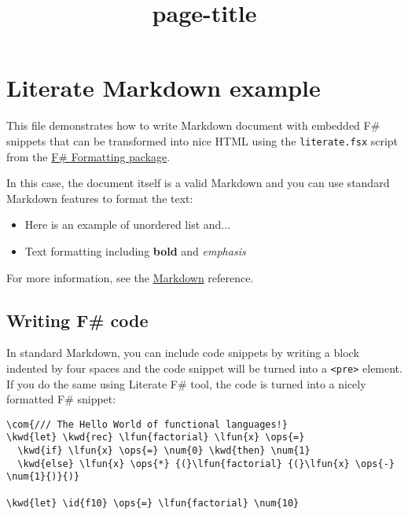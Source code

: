 \documentclass{article}
\title{{page-title}}
\date{}
\newcommand{\id}[1]{\textcolor{black}{#1}}
\newcommand{\com}[1]{\textcolor{officegreen}{#1}}
\newcommand{\kwd}[1]{\textcolor{navy}{#1}}
\newcommand{\num}[1]{\textcolor{officegreen}{#1}}
\newcommand{\ops}[1]{\textcolor{purple}{#1}}
\begin{document}
\maketitle

\section*{Literate Markdown example}



This file demonstrates how to write Markdown document with
embedded F\# snippets that can be transformed into nice HTML
using the \texttt{literate.fsx} script from the \href{http://fsprojects.github.io/FSharp.Formatting}{F\# Formatting
package}.


In this case, the document itself is a valid Markdown and
you can use standard Markdown features to format the text:
\begin{itemize}
\item Here is an example of unordered list and...

\item Text formatting including \textbf{bold} and \emph{emphasis}

\end{itemize}



For more information, see the \href{http://daringfireball.net/projects/markdown}{Markdown} reference.
\subsection*{Writing F\# code}



In standard Markdown, you can include code snippets by
writing a block indented by four spaces and the code
snippet will be turned into a \texttt{<pre>} element. If you do
the same using Literate F\# tool, the code is turned into
a nicely formatted F\# snippet:
\begin{Verbatim}[commandchars=\\\{\}]
\com{/// The Hello World of functional languages!}
\kwd{let} \kwd{rec} \lfun{factorial} \lfun{x} \ops{=} 
  \kwd{if} \lfun{x} \ops{=} \num{0} \kwd{then} \num{1} 
  \kwd{else} \lfun{x} \ops{*} {(}\lfun{factorial} {(}\lfun{x} \ops{-} \num{1}{)}{)}

\kwd{let} \id{f10} \ops{=} \lfun{factorial} \num{10}

\end{Verbatim}
\end{document}
